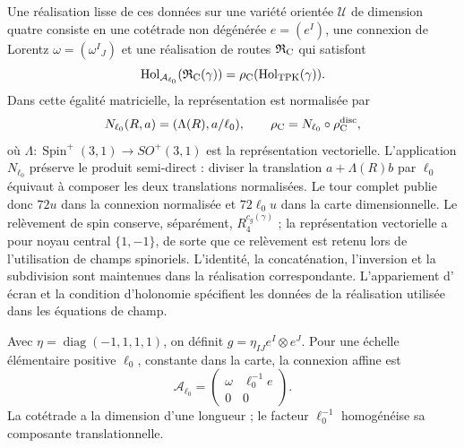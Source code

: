 Une réalisation lisse de ces données sur une variété orientée \(\mathcal U\) de dimension quatre consiste en une cotétrade non dégénérée \(e=(e^I)\), une connexion de Lorentz \(\omega=(\omega^I{}_J)\) et une réalisation de routes \(\mathfrak R_{\rm C}\) qui satisfont
\begin{equation}
 \operatorname{Hol}_{\mathcal A_{\ell_0}}
       (\mathfrak R_{\rm C}(\gamma))
 =\rho_{\rm C}(\operatorname{Hol}_{\rm TPK}(\gamma)).
 \label{vii:vii:eq:compatibilidad-holonomia-geometrica}
\end{equation}
Dans cette égalité matricielle, la représentation est normalisée par
\[
 N_{\ell_0}(R,a)=(\Lambda(R),a/\ell_0),\qquad
 \rho_{\rm C}=N_{\ell_0}\circ\rho_{\rm C}^{\rm disc},
\]
où \(\Lambda:\operatorname{Spin}^+(3,1)\to SO^+(3,1)\)
est la représentation vectorielle. L'application \(N_{\ell_0}\)
préserve le produit semi-direct : diviser la translation
\(a+\Lambda(R)b\) par \(\ell_0\) équivaut à composer les
deux translations normalisées. Le tour complet publie donc
\(72u\) dans la connexion normalisée et \(72\ell_0u\) dans la
carte dimensionnelle. Le relèvement de spin conserve, séparément,
\(R_4^{c_g(\gamma)}\) ; la représentation vectorielle a pour
noyau central \(\{1,-1\}\), de sorte que ce
relèvement est retenu lors de l'utilisation de champs spinoriels.
L'identité, la concaténation, l'inversion et la subdivision sont maintenues dans la
réalisation correspondante. L'appariement d'
écran et la condition d'holonomie spécifient les données de la
réalisation utilisée dans les équations de champ.

Avec \(\eta=\operatorname{diag}(-1,1,1,1)\), on définit
\(g=\eta_{IJ}e^I\otimes e^J\). Pour une échelle élémentaire
positive \(\ell_0\), constante dans la carte, la connexion affine est
\begin{equation}
 \mathcal A_{\ell_0}
 =\begin{pmatrix}\omega&\ell_0^{-1}e\\0&0\end{pmatrix}.
 \label{vii:vii:eq:conexion-afin-realizada}
\end{equation}
La cotétrade a la dimension d'une longueur ; le facteur \(\ell_0^{-1}\) homogénéise sa composante translationnelle.

